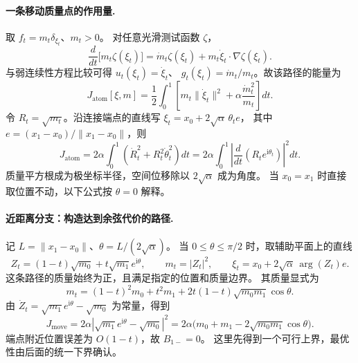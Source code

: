 \documentclass[UTF8,a4paper,11pt,fontset=fandol]{ctexart}
\begin{document}
\paragraph{一条移动质量点的作用量.}
取 $f_t=m_t\delta_{\xi_t}$、$m_t>0$。
对任意光滑测试函数 $\zeta$，
\begin{equation}
\frac d{dt}\bigl[m_t\zeta(\xi_t)\bigr]
=\dot m_t\zeta(\xi_t)+m_t\dot\xi_t\cdot\nabla\zeta(\xi_t).
\end{equation}
与弱连续性方程比较可得 $u_t(\xi_t)=\dot\xi_t$、
$g_t(\xi_t)=\dot m_t/m_t$。故该路径的能量为
\begin{equation}
J_{\mathrm{atom}}[\xi,m]
=\frac12\int_0^1
\left[m_t\|\dot\xi_t\|^2
+\alpha\frac{\dot m_t^2}{m_t}\right]dt.
\label{eq:single-atom-wfr-action}
\end{equation}
令 $R_t=\sqrt{m_t}$。沿连接端点的直线写
$\xi_t=x_0+2\sqrt\alpha\,\theta_t e$，
其中 $e=(x_1-x_0)/\|x_1-x_0\|$，则
\begin{equation}
J_{\mathrm{atom}}
=2\alpha\int_0^1(\dot R_t^2+R_t^2\dot\theta_t^2)dt
=2\alpha\int_0^1\left|\frac d{dt}(R_te^{\mathrm i\theta_t})\right|^2dt.
\label{eq:cone-polar-action}
\end{equation}
质量平方根成为极坐标半径，空间位移除以 $2\sqrt\alpha$ 成为角度。
当 $x_0=x_1$ 时直接取位置不动，以下公式按 $\theta=0$ 解释。

\paragraph{近距离分支：构造达到余弦代价的路径.}
记 $L=\|x_1-x_0\|$、$\theta=L/(2\sqrt\alpha)$。
当 $0\le\theta\le\pi/2$ 时，取辅助平面上的直线
\begin{equation}
Z_t=(1-t)\sqrt{m_0}+t\sqrt{m_1}e^{\mathrm i\theta},\qquad
m_t=|Z_t|^2,\qquad
\xi_t=x_0+2\sqrt\alpha\,\arg(Z_t)e.
\end{equation}
这条路径的质量始终为正，且满足指定的位置和质量边界。
其质量显式为
\begin{equation}
m_t=(1-t)^2m_0+t^2m_1
+2t(1-t)\sqrt{m_0m_1}\cos\theta.
\end{equation}
由 $\dot Z_t=\sqrt{m_1}e^{\mathrm i\theta}-\sqrt{m_0}$ 为常量，得到
\begin{equation}
J_{\mathrm{move}}
=2\alpha\left|\sqrt{m_1}e^{\mathrm i\theta}-\sqrt{m_0}\right|^2
=2\alpha\bigl(m_0+m_1-2\sqrt{m_0m_1}\cos\theta\bigr).
\label{eq:wfr-moving-upper-bound}
\end{equation}
端点附近位置误差为 $O(1-t)$，故 $B_{1-}=0$。
这里先得到一个可行上界，最优性由后面的统一下界确认。
\end{document}
